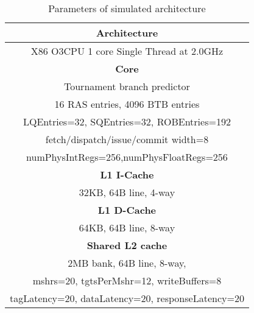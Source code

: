 \begin{table}[!htbp]
\small
\centering
\begin{tabular}{|c|}
\hline
\textbf{Architecture}  \\ \hline
X86 O3CPU 1 core Single Thread at 2.0GHz \\ \hline

\textbf{Core}  \\ \hline
Tournament branch predictor\\
16 RAS entries, 4096 BTB entries\\
LQEntries=32, SQEntries=32, ROBEntries=192\\
fetch/dispatch/issue/commit width=8\\
numPhysIntRegs=256,numPhysFloatRegs=256 \\ \hline

\textbf{L1 I-Cache}  \\ \hline
32KB, 64B line, 4-way \\ \hline

\textbf{L1 D-Cache}  \\ \hline
64KB, 64B line, 8-way \\ \hline

\textbf{Shared L2 cache}  \\ \hline
2MB bank, 64B line, 8-way,  \\
mshrs=20, tgtsPerMshr=12, writeBuffers=8  \\ 
tagLatency=20, dataLatency=20, responseLatency=20\\ \hline
\end{tabular}
\caption{Parameters of simulated architecture}
  \label{table:GEM5}
\end{table}